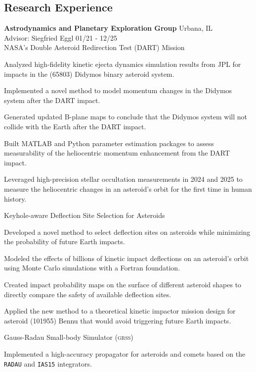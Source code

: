 \documentclass[margin,line]{res}
\newlength{\myitemspacing}
\newenvironment{list_new}{
    \begin{list}{\scriptsize{$\bullet$}}{%
        \setlength{\itemsep}{0in}
        \setlength{\parsep}{\myitemspacing} \setlength{\parskip}{0in}
        \setlength{\topsep}{0in} \setlength{\partopsep}{0in} 
        \setlength{\leftmargin}{0.2in}
        }}
    {\end{list}
}
\begin{document}
\begin{resume}
\section{\sc Research Experience}
{\bf Astrodynamics and Planetary Exploration Group} \hfill Urbana, IL\\
Advisor: Siegfried Eggl \hfill 01/21 - 12/25\\
NASA's Double Asteroid Redirection Test (DART) Mission
\begin{list_new}
    \item Analyzed high-fidelity kinetic ejecta dynamics simulation results from JPL for impacts in the (65803) Didymos binary asteroid system.
    \item Implemented a novel method to model momentum changes in the Didymos system after the DART impact.
    \item Generated updated B-plane maps to conclude that the Didymos system will not collide with the Earth after the DART impact.
    \item Built MATLAB and Python parameter estimation packages to assess measurability of the heliocentric momentum enhancement from the DART impact.
    \item Leveraged high-precision stellar occultation measurements in 2024 and 2025 to measure the heliocentric changes in an asteroid's orbit for the first time in human history.
\end{list_new}
Keyhole-aware Deflection Site Selection for Asteroids
\begin{list_new}
    \item Developed a novel method to select deflection sites on asteroids while minimizing the probability of future Earth impacts.
    \item Modeled the effects of billions of kinetic impact deflections on an asteroid's orbit using Monte Carlo simulations with a Fortran foundation.
    \item Created impact probability maps on the surface of different asteroid shapes to directly compare the safety of available deflection sites.
    \item Applied the new method to a theoretical kinetic impactor mission design for asteroid (101955) Bennu that would avoid triggering future Earth impacts.
\end{list_new}
Gauss-Radau Small-body Simulator (\textsc{grss})
\begin{list_new}
    \item Implemented a high-accuracy propagator for asteroids and comets based on the \texttt{RADAU} and \texttt{IAS15} integrators.

\end{list_new}
\end{resume}
\end{document}
